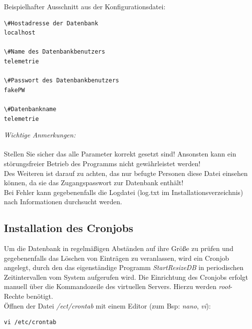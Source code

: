 \documentclass[fontsize = 12pt, paper = a4]{scrreprt}
\begin{document}
Beispielhafter Ausschnitt aus der Konfigurationsdatei:\\

\vspace*{4mm}
\begin{lstlisting}[frame=single]
\#Hostadresse der Datenbank
localhost

\#Name des Datenbankbenutzers
telemetrie

\#Passwort des Datenbankbenutzers
fakePW

\#Datenbankname
telemetrie 
\end{lstlisting} 
\vspace*{-2mm}

    


\textit{Wichtige Anmerkungen:} \\ \\
Stellen Sie sicher das alle Parameter korrekt gesetzt sind! Ansonsten kann ein störungsfreier Betrieb des Programms nicht gewährleistet werden!\\
Des Weiteren ist darauf zu achten, das nur befugte Personen diese Datei einsehen können, da sie das Zugangspasswort zur Datenbank enthält!\\
Bei Fehler kann gegebenenfalls die Logdatei (log.txt im Installationsverzeichnis) nach Informationen durchsucht werden.

\subsection{Installation des Cronjobs}

Um die Datenbank in regelmäßigen Abständen auf ihre Größe zu prüfen und gegebenenfalls das Löschen von Einträgen zu veranlassen, wird ein Cronjob angelegt, durch den das eigenständige Programm \textit{StartResizeDB} in periodischen Zeitintervallen vom System aufgerufen wird.
Die Einrichtung des Cronjobs erfolgt manuell über die Kommandozeile des virtuellen Servers. Hierzu werden \textit{root}-Rechte benötigt.\\

Öffnen der Datei \textit{/ect/crontab} mit einem Editor (zum Bsp: \textit{nano}, \textit{vi}):\\

\vspace*{4mm}
\begin{lstlisting}[frame=single]
 vi /etc/crontab  
\end{lstlisting} 
\vspace*{-2mm}
   
\end{document}

